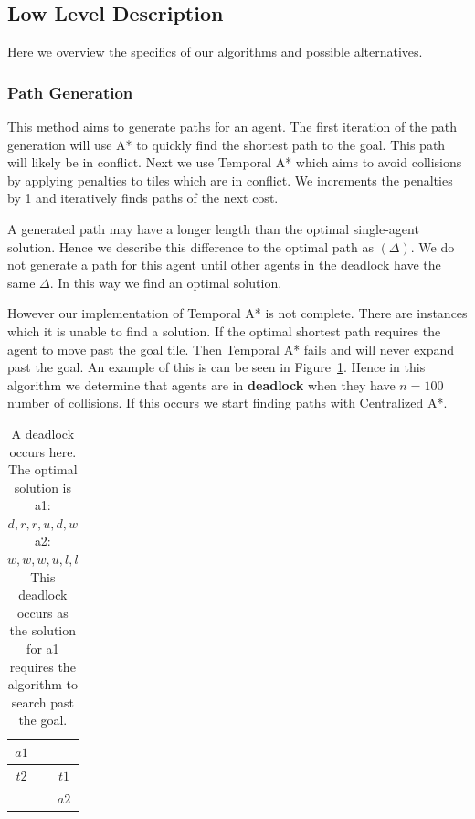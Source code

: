 \documentclass[a4paper,11pt]{article}
\begin{document}
\subsection{Low Level Description} \label{sec:low-level}
Here we overview the specifics of our algorithms and possible alternatives.

\subsubsection{Path Generation} \label{sec:generating-paths}
This method aims to generate paths for an agent. The first iteration of the path generation will use A* to quickly find the shortest path to the goal. This path will likely be in conflict. Next we use Temporal A* which aims to avoid collisions by applying penalties to tiles which are in conflict. We increments the penalties by 1 and iteratively finds paths of the next cost. 

A generated path may have a longer length than the optimal single-agent solution. Hence we describe this difference to the optimal path as $(\Delta)$. We do not generate a path for this agent until other agents in the deadlock have the same $\Delta$. In this way we find an optimal solution.

However our implementation of Temporal A* is not complete. There are instances which it is unable to find a solution. If the optimal shortest path requires the agent to move past the goal tile. Then Temporal A* fails and will never expand past the goal. An example of this is can be seen in Figure~\ref{fig:deadlock}. Hence in this algorithm we determine that agents are in \textbf{deadlock} when they have $n=100$ number of collisions. If this occurs we start finding paths with Centralized A*. 


\begin{table}[h]
	\centering
	\footnotesize
	\begin{tabular}{|c|c|c|}
		\hline
		$a1$ & \cellcolor{black} & \\ \hline
		$t2$ & & $t1$ \\ \hline
		& \cellcolor{black} & $a2$ \\ \hline
	\end{tabular}
	
	\caption{A deadlock occurs here. The optimal solution is 
		\\ a1: $d,r,r,u,d,w$
		\\ a2: $w,w,w,u,l,l$
		\\ This deadlock occurs as the solution for a1 requires the algorithm to search past the goal.}
	\label{fig:deadlock}
\end{table}
\end{document}
